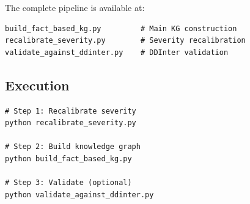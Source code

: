 \documentclass[11pt,a4paper]{article}
\begin{document}
The complete pipeline is available at:
\begin{verbatim}
build_fact_based_kg.py         # Main KG construction
recalibrate_severity.py        # Severity recalibration
validate_against_ddinter.py    # DDInter validation
\end{verbatim}

\subsection{Execution}

\begin{verbatim}
# Step 1: Recalibrate severity
python recalibrate_severity.py

# Step 2: Build knowledge graph
python build_fact_based_kg.py

# Step 3: Validate (optional)
python validate_against_ddinter.py
\end{verbatim}
\end{document}
